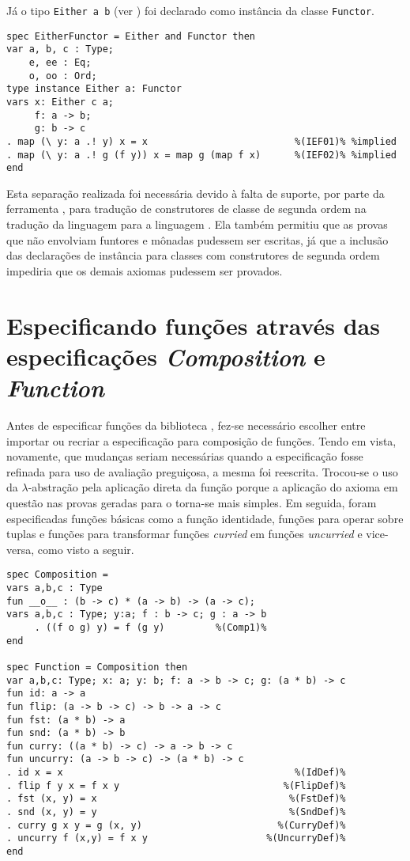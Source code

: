 Já o tipo \Verb.Either a b. (ver ) foi declarado como instância da classe \Verb.Functor..

\begin{Verbatim}
spec EitherFunctor = Either and Functor then
var a, b, c : Type;
    e, ee : Eq;
    o, oo : Ord;
type instance Either a: Functor
vars x: Either c a;  
     f: a -> b;
     g: b -> c
. map (\ y: a .! y) x = x                          %(IEF01)% %implied
. map (\ y: a .! g (f y)) x = map g (map f x)      %(IEF02)% %implied
end
\end{Verbatim}

Esta separação realizada foi necessária devido à falta de suporte, por parte da ferramenta \Hets, para tradução de construtores de classe de segunda ordem na tradução da linguagem \HasCASL para a linguagem \HOL.
Ela também permitiu que as provas que não envolviam funtores e mônadas pudessem ser escritas, já que a inclusão das declarações de instância para classes com construtores de segunda ordem impediria que os demais axiomas pudessem ser provados.

\section{Especificando funções através das especificações \textit{Composition} e \textit{Function}}
Antes de especificar funções da biblioteca \Prelude, fez-se necessário escolher entre importar ou recriar a especificação para composição de funções.
Tendo em vista, novamente, que mudanças seriam necessárias quando a especificação fosse refinada para uso de avaliação preguiçosa, a mesma foi reescrita.
Trocou-se o uso da $\lambda$-abstração pela aplicação direta da função porque a aplicação do axioma em questão nas provas geradas para o \Isabelle torna-se mais simples.
Em seguida, foram especificadas funções básicas como a função identidade, funções para operar sobre tuplas e funções para transformar funções \textit{curried} em funções \textit{uncurried} e vice-versa, como visto a seguir.

\begin{Verbatim}
spec Composition =
vars a,b,c : Type
fun __o__ : (b -> c) * (a -> b) -> (a -> c);
vars a,b,c : Type; y:a; f : b -> c; g : a -> b
     . ((f o g) y) = f (g y)         %(Comp1)%
end

spec Function = Composition then
var a,b,c: Type; x: a; y: b; f: a -> b -> c; g: (a * b) -> c
fun id: a -> a
fun flip: (a -> b -> c) -> b -> a -> c
fun fst: (a * b) -> a
fun snd: (a * b) -> b
fun curry: ((a * b) -> c) -> a -> b -> c
fun uncurry: (a -> b -> c) -> (a * b) -> c
. id x = x                                         %(IdDef)%
. flip f y x = f x y                             %(FlipDef)%
. fst (x, y) = x                                  %(FstDef)%
. snd (x, y) = y                                  %(SndDef)%
. curry g x y = g (x, y)                        %(CurryDef)%
. uncurry f (x,y) = f x y                     %(UncurryDef)%
end
\end{Verbatim}

